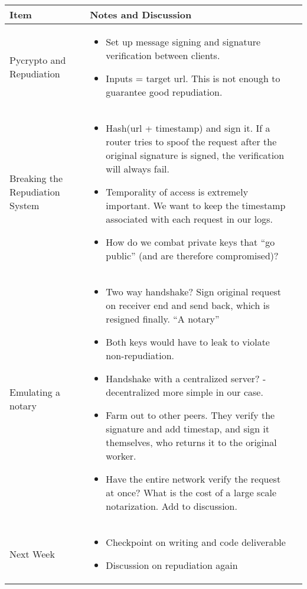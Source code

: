 \documentclass[a4wide,10pt]{extarticle}
\begin{document}
\vspace{0.5cm}
\begin{center}
\begin{tabular}{| m{3.0cm} | m{12.6cm} | m{2cm}|} \hline
\textbf{Item} & \textbf{Notes and Discussion}\\ \hline

Pycrypto and Repudiation & 
	\begin{itemize}
		\item Set up message signing and signature verification between clients. 
		\item Inputs = target url. This is not enough to guarantee good repudiation.
	\end{itemize} 
\\ \hline
Breaking the Repudiation System &
	\begin{itemize}
		\item Hash(url + timestamp) and sign it. If a router tries to spoof the request after the original signature is signed, the verification will always fail.
		\item Temporality of access is extremely important. We want to keep the timestamp associated with each request in our logs.
		\item How do we combat private keys that ``go public'' (and are therefore compromised)?
	\end{itemize}
\\ \hline

Emulating a notary &
	\begin{itemize}
		\item Two way handshake? Sign original request on receiver end and send back, which is resigned finally. ``A notary''
		\item Both keys would have to leak to violate non-repudiation.
		\item Handshake with a centralized server? - decentralized more simple in our case.
		\item Farm out to other peers. They verify the signature and add timestap, and sign it themselves, who returns it to the original worker.
		\item Have the entire network verify the request at once? What is the cost of a large scale notarization. Add to discussion.
	\end{itemize}
\\ \hline

Next Week &
	\begin{itemize}
		\item Checkpoint on writing and code deliverable
		\item Discussion on repudiation again
	\end{itemize}
\\ \hline

\end{tabular}
\end{center}
\end{document}
